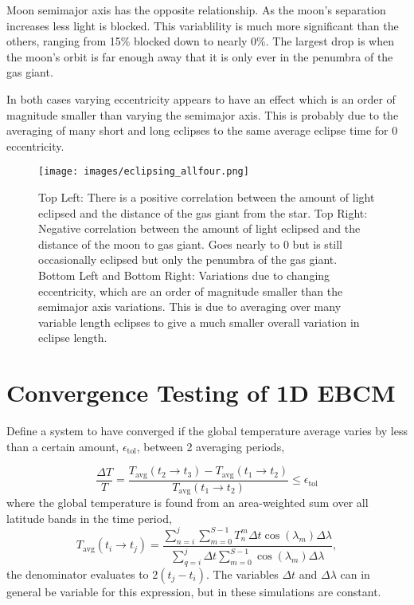 \documentclass[12pt, onecolumn]{revtex4-2}    %
\begin{document}
Moon semimajor axis has the opposite relationship.
As the moon's separation increases less light is blocked.
This variablility is much more significant than the others, ranging from 15\% blocked down to nearly 0\%.
The largest drop is when the moon's orbit is far enough away that it is only ever in the penumbra of the gas giant.

In both cases varying eccentricity appears to have an effect which is an order of magnitude smaller than varying the semimajor axis.
This is probably due to the averaging of many short and long eclipses to the same average eclipse time for 0 eccentricity.

\begin{figure}
    \texttt{[image: images/eclipsing\_allfour.png]}
    \caption{
        Top Left: There is a positive correlation between the amount of light eclipsed and the distance of the gas giant from the star.
        Top Right: Negative correlation between the amount of light eclipsed and the distance of the moon to gas giant.
        Goes nearly to 0 but is still occasionally eclipsed but only the penumbra of the gas giant.
        Bottom Left and Bottom Right: Variations due to changing eccentricity, which are an order of magnitude smaller than the semimajor axis variations.
        This is due to averaging over many variable length eclipses to give a much smaller overall variation in eclipse length.
    }
    \label{fig:eclipsing}
\end{figure}

\section{Convergence Testing of 1D EBCM} \label{sec:conv_testing}

Define a system to have converged if the global temperature average varies by less than a certain amount, $\epsilon_{\text{tol}}$, between 2 averaging periods,

\begin{equation*}
    \frac{\Delta T}{T} = \frac{T_{\text{avg}}(t_2 \to t_3) - T_{\text{avg}}(t_1 \to t_2)}{T_{\text{avg}}(t_1 \to t_2)}
    \le \epsilon_{\text{tol}}
\end{equation*}
where the global temperature is found from an area-weighted sum over all latitude bands in the time period,
\begin{equation}
    T_{\text{avg}}(t_i \to t_j) = \frac{\sum_{n = i}^{j} \sum_{m = 0}^{S-1} T^m_n \Delta t \cos(\lambda_m)\Delta \lambda}{\sum_{q = i}^{j} \Delta t \sum_{m=0}^{S-1} \cos(\lambda_m)\Delta \lambda},
\end{equation}
the denominator evaluates to $2 (t_j - t_i)$. The variables $\Delta t$ and $\Delta \lambda$ can in general be variable for this expression, but in these simulations are constant.
\end{document}
